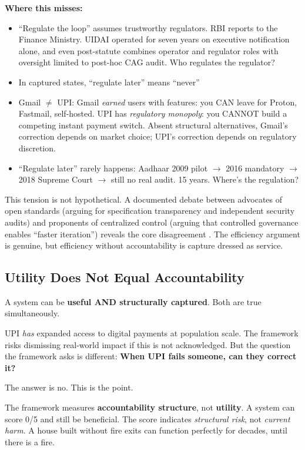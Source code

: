 \documentclass{article}
\begin{document}
\textbf{Where this misses:}
\begin{itemize}
    \item ``Regulate the loop'' assumes trustworthy regulators. RBI reports to the Finance Ministry. UIDAI operated for seven years on executive notification alone, and even post-statute combines operator and regulator roles with oversight limited to post-hoc CAG audit. Who regulates the regulator?
    \item In captured states, ``regulate later'' means ``never''
    \item Gmail $\neq$ UPI: Gmail \textit{earned} users with features: you CAN leave for Proton, Fastmail, self-hosted. UPI has \textit{regulatory monopoly}: you CANNOT build a competing instant payment switch. Absent structural alternatives, Gmail's correction depends on market choice; UPI's correction depends on regulatory discretion.
    \item ``Regulate later'' rarely happens: Aadhaar 2009 pilot $\rightarrow$ 2016 mandatory $\rightarrow$ 2018 Supreme Court $\rightarrow$ still no real audit. 15 years. Where's the regulation?
\end{itemize}

This tension is not hypothetical. A documented debate between advocates of open standards (arguing for specification transparency and independent security audits) and proponents of centralized control (arguing that controlled governance enables ``faster iteration'') reveals the core disagreement \citep{abraham2020}. The efficiency argument is genuine, but efficiency without accountability is capture dressed as service.

\subsection{Utility Does Not Equal Accountability}
\label{subsec:utility}

A system can be \textbf{useful AND structurally captured}. Both are true simultaneously.

UPI \textit{has} expanded access to digital payments at population scale. The framework risks dismissing real-world impact if this is not acknowledged. But the question the framework asks is different: \textbf{When UPI fails someone, can they correct it?}

The answer is no. This is the point.

The framework measures \textbf{accountability structure}, not \textbf{utility}. A system can score 0/5 and still be beneficial. The score indicates \textit{structural risk}, not \textit{current harm}. A house built without fire exits can function perfectly for decades, until there is a fire.
\end{document}
